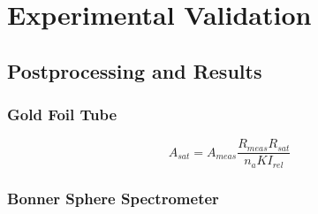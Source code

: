 
\cleardoublepage


\chapter{Experimental Validation}



\section{Postprocessing and Results}


\subsection{Gold Foil Tube}



\begin{equation}
\label{eqn:a_sat}
A_{sat} = A_{meas} \frac{R_{meas} R_{sat}}{n_a K I_{rel}}
\end{equation}




\subsection{Bonner Sphere Spectrometer}
